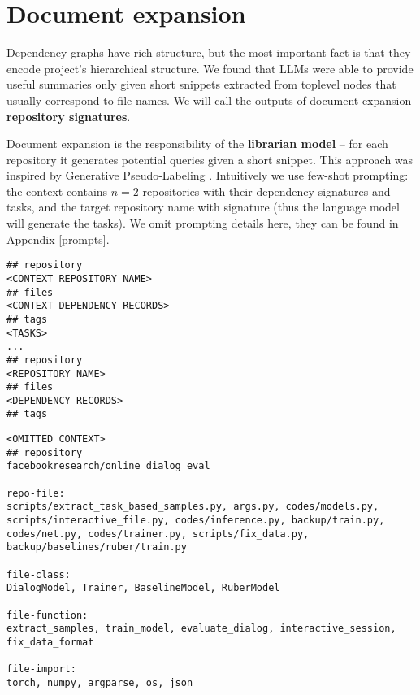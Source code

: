 \section{Document expansion}
\label{approach_document_expansion}
Dependency graphs have rich structure, but the most important fact is that they encode project's hierarchical structure. We found that LLMs were able to provide useful summaries only given short snippets extracted from toplevel nodes that usually correspond to file names. We will call the outputs of document expansion \textbf{repository signatures}.

Document expansion is the responsibility of the \textbf{librarian model} -- for each repository it generates potential queries given a short snippet. This approach was inspired by Generative Pseudo-Labeling \cite{gpl}. Intuitively we use few-shot prompting: the context contains $n=2$ repositories with their dependency signatures and tasks, and the target repository name with signature (thus the language model will generate the tasks). We omit prompting details here, they can be found in Appendix \ref{prompts}.

\begin{samepage}
\begin{lstlisting}[caption=Few-shot prompt format]
## repository
<CONTEXT REPOSITORY NAME>
## files
<CONTEXT DEPENDENCY RECORDS>
## tags
<TASKS>
...
## repository
<REPOSITORY NAME>
## files
<DEPENDENCY RECORDS>
## tags
\end{lstlisting}
\end{samepage}

\begin{samepage}
\begin{lstlisting}[caption=Input repository]
<OMITTED CONTEXT>
## repository
facebookresearch/online_dialog_eval

repo-file:
scripts/extract_task_based_samples.py, args.py, codes/models.py, scripts/interactive_file.py, codes/inference.py, backup/train.py, codes/net.py, codes/trainer.py, scripts/fix_data.py, backup/baselines/ruber/train.py

file-class:
DialogModel, Trainer, BaselineModel, RuberModel

file-function:
extract_samples, train_model, evaluate_dialog, interactive_session, fix_data_format

file-import:
torch, numpy, argparse, os, json
\end{lstlisting}
\end{samepage}


\begin{samepage}
\begin{lstlisting}[caption=Generated text]

\end{lstlisting}
\end{samepage}
